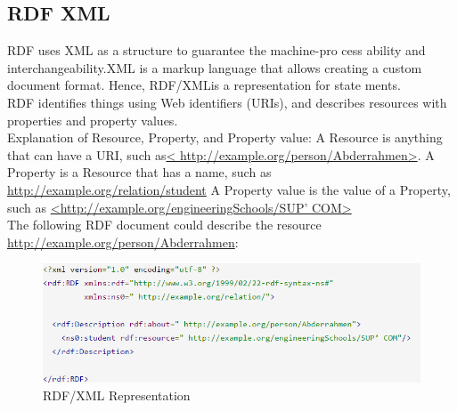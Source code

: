 \documentclass[a4paper,12pt,oneside]{report}
\begin{document}
{{{\subsection{RDF XML}
{RDF uses XML as a structure to guarantee the machine-pro cess ability and interchangeability.XML is a markup language that allows creating a custom document format. Hence, RDF/XMLis a representation for state ments.\\
RDF identifies things using Web identifiers (URIs), and describes resources with properties and property values.\\
Explanation of Resource, Property, and Property value:
A Resource is anything that can have a URI, such as\url{< http://example.org/person/Abderrahmen>}.
A Property is a Resource that has a name, such as \url {http://example.org/relation/student} 
A Property value is the value of a Property, such as \url {<http://example.org/engineeringSchools/SUP’ COM>}\\
The following RDF document could describe the resource \url {http://example.org/person/Abderrahmen}:\\
\begin{figure}[ht]
\centering
\includegraphics[width=1\textwidth]{Capture21}
\caption{RDF/XML Representation}
\end{figure}
 }
}}}
\end{document}

